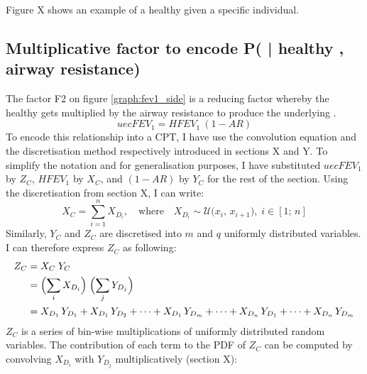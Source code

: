 Figure X shows an example of a healthy \F given a specific individual. 


\subsection{Multiplicative factor to encode P( \F | healthy \F, airway resistance)}
The factor F2 on figure \ref{graph:fev1_side} is a reducing factor whereby the healthy \F gets multiplied by the airway resistance to produce the underlying \F.
\begin{equation}
uecF\!EV_1 = H\!F\!EV_1\ (1-A\!R)
\end{equation}
To encode this relationship into a CPT, I have use the convolution equation and the discretisation method respectively introduced in sections X and Y. To simplify the notation and for generalisation purposes, I have substituted $uecF\!EV_1$ by $Z_C$, $H\!F\!EV_1$ by $X_C$, and $(1-A\!R)$ by $Y_C$ for the rest of the section. Using the discretisation from section X, I can write:
\begin{equation}
X_C = \sum_{i = 1}^n X_{D_i},
\quad\text{where}\quad
X_{D_i} \sim \mathcal{U}\bigl(x_i,\,x_{i+1}\bigr),\; i\!\in\![1;\,n]
\end{equation}
Similarly, $Y_{C}$ and $Z_C$ are discretised into $m$ and $q$ uniformly distributed variables. I can therefore express $Z_C$ as following:
\begin{equation}
\begin{aligned}
Z_C &= X_C \; Y_C 
\\
&= \Bigl(\sum_{i} X_{D_i}\Bigr)
   \;
   \Bigl(\sum_{j} Y_{D_j}\Bigr)
\\
&= X_{D_1}\,Y_{D_1}
   + X_{D_1}\,Y_{D_2}
   +\dots+X_{D_1}\,Y_{D_m}
   +\dots+X_{D_n}\,Y_{D_1}+\dots+X_{D_n}\,Y_{D_m}
\end{aligned}
\end{equation}
$Z_C$ is a series of bin-wise multiplications of uniformly distributed random variables. The contribution of each term to the PDF of  $Z_C$ can be computed by convolving $X_{D_i}$ with $Y_{D_j}$ multiplicatively (section X):
